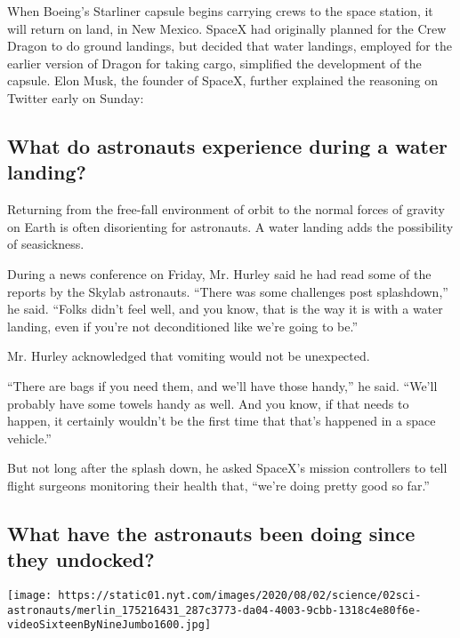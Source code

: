 When Boeing's Starliner capsule begins carrying crews to the space
station, it will return on land, in New Mexico. SpaceX had originally
planned for the Crew Dragon to do ground landings, but decided that
water landings, employed for the earlier version of Dragon for taking
cargo, simplified the development of the capsule. Elon Musk, the founder
of SpaceX, further explained the reasoning on Twitter early on Sunday:

\hypertarget{what-do-astronauts-experience-during-a-water-landing}{%
\subsection{What do astronauts experience during a water
landing?}\label{what-do-astronauts-experience-during-a-water-landing}}

Returning from the free-fall environment of orbit to the normal forces
of gravity on Earth is often disorienting for astronauts. A water
landing adds the possibility of seasickness.

During a news conference on Friday, Mr. Hurley said he had read some of
the reports by the Skylab astronauts. ``There was some challenges post
splashdown,'' he said. ``Folks didn't feel well, and you know, that is
the way it is with a water landing, even if you're not deconditioned
like we're going to be.''

Mr. Hurley acknowledged that vomiting would not be unexpected.

``There are bags if you need them, and we'll have those handy,'' he
said. ``We'll probably have some towels handy as well. And you know, if
that needs to happen, it certainly wouldn't be the first time that
that's happened in a space vehicle.''

But not long after the splash down, he asked SpaceX's mission
controllers to tell flight surgeons monitoring their health that,
``we're doing pretty good so far.''

\hypertarget{what-have-the-astronauts-been-doing-since-they-undocked}{%
\subsection{What have the astronauts been doing since they
undocked?}\label{what-have-the-astronauts-been-doing-since-they-undocked}}

\texttt{[image: https://static01.nyt.com/images/2020/08/02/science/02sci-astronauts/merlin\_175216431\_287c3773-da04-4003-9cbb-1318c4e80f6e-videoSixteenByNineJumbo1600.jpg]}

